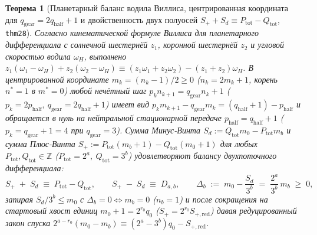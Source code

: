 \documentclass[11pt,a4paper]{article}
\newtheorem{theorem}{Теорема}[section]
\theoremstyle{definition}
\theoremstyle{remark}
\begin{document}
\begin{theorem}[Планетарный баланс водила Виллиса, центрированная координата для $q_{\mathrm{gear}}=2q_{\mathrm{half}}+1$ и двойственность двух полуосей $S_+ + S_d \equiv P_{\mathrm{tot}} - Q_{\mathrm{tot}}$, \texttt{thm28}]
\label{thm:plus-minus-rotor-duality}
Согласно кинематической формуле Виллиса для планетарного дифференциала с солнечной шестернёй $z_1$, коронной шестернёй $z_2$ и угловой скоростью водила $\omega_H$, выполнено $z_1(\omega_1 - \omega_H) + z_2(\omega_2 - \omega_H) \equiv (z_1\omega_1 + z_2\omega_2) - (z_1+z_2)\omega_H$. В центрированной координате $m_k = (n_k - 1)/2 \ge 0$ ($n_k = 2 m_k + 1$, корень $n^* = 1$ в $m^* = 0$) любой нечётный шаг $p_k n_{k+1} = q_{\mathrm{gear}} n_k + 1$ ($p_k = 2p_{\mathrm{half}},\ q_{\mathrm{gear}} = 2q_{\mathrm{half}}+1$) имеет вид $p_k m_{k+1} - q_{\mathrm{gear}} m_k = (q_{\mathrm{half}}+1) - p_{\mathrm{half}}$ и обращается в нуль на нейтральной стационарной передаче $p_{\mathrm{half}} = q_{\mathrm{half}}+1$ ($p_k = q_{\mathrm{gear}}+1 = 4$ при $q_{\mathrm{gear}}=3$). Сумма Минус-Винта $S_d := Q_{\mathrm{tot}} m_0 - P_{\mathrm{tot}} m_b$ и сумма Плюс-Винта $S_+ := P_{\mathrm{tot}}(m_b + 1) - Q_{\mathrm{tot}}(m_0 + 1)$ для любых $P_{\mathrm{tot}},Q_{\mathrm{tot}}\in\mathbb{Z}$ ($P_{\mathrm{tot}}=2^a,\ Q_{\mathrm{tot}}=3^b$) удовлетворяют балансу двухпоточного дифференциала:
\begin{equation}
  \label{eq:plus-minus-rotor-duality}
  S_+ \;+\; S_d \;\equiv\; P_{\mathrm{tot}} - Q_{\mathrm{tot}}, \qquad
  S_+ \;-\; S_d \;\equiv\; D_{a,b}, \qquad
  \Delta_b \;:=\; m_0 - \frac{S_d}{3^b} \;=\; \frac{2^a}{3^b}\,m_b \;\ge\; 0,
\end{equation}
запирая $S_d/3^b \le m_0$ с $\Delta_b = 0 \iff m_b = 0$ ($n_b = 1$) и после сокращения на стартовый хвост единиц $m_0 + 1 = 2^{r_0} q_0$ ($S_+ = 2^{r_0} S_{+,\mathrm{red}}$) давая редуцированный закон спуска $2^{a - r_0}(m_0 - m_b) \equiv (2^a - 3^b) q_0 - S_{+,\mathrm{red}}$.
\end{theorem}
\end{document}
